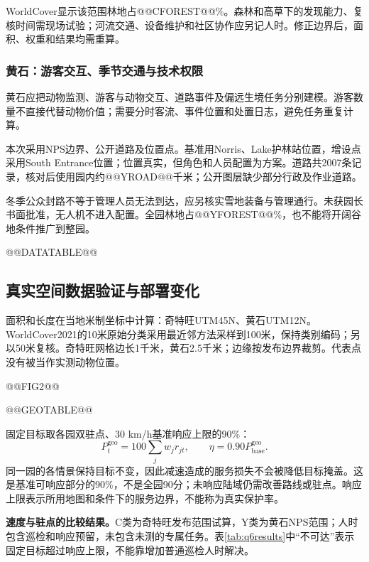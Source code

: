 \documentclass[UTF8,fontset=fandol,12pt,a4paper]{ctexart}
\begin{document}
WorldCover显示该范围林地占@@CFOREST@@\%\cite{worldcover}。森林和高草下的发现能力、复核时间需现场试验；河流交通、设备维护和社区协作应另记人时。修正边界后，面积、权重和结果均需重算。

\subsubsection{黄石：游客交互、季节交通与技术权限}

黄石应把动物监测、游客与动物交互、道路事件及偏远生境任务分别建模\cite{visitor}。游客数量不直接代替动物价值；需要分时客流、事件位置和处置日志，避免任务重复计算。

本次采用NPS边界、公开道路及位置点\cite{npsboundary,npsroads,npspois}。基准用Norris、Lake护林站位置，增设点采用South Entrance位置；位置真实，但角色和人员配置为方案。道路共2007条记录，核对后使用园内约@@YROAD@@千米；公开图层缺少部分行政及作业道路。

冬季公众封路不等于管理人员无法到达，应另核实雪地装备与管理通行\cite{conditions}。未获园长书面批准，无人机不进入配置\cite{rules}。全园林地占@@YFOREST@@\%，也不能将开阔谷地条件推广到整园。

@@DATATABLE@@

\clearpage
\subsection{真实空间数据验证与部署变化}

面积和长度在当地米制坐标中计算：奇特旺UTM45N、黄石UTM12N。WorldCover2021的10米原始分类采用最近邻方法采样到100米，保持类别编码；另以50米复核。奇特旺网格边长1千米，黄石2.5千米；边缘按发布边界裁剪。代表点没有被当作实测动物位置。

@@FIG2@@

@@GEOTABLE@@

固定目标取各园双驻点、30 km/h基准响应上限的90\%：
\begin{equation}
P_t^{\mathrm{geo}}=100\sum_jw_jr_{jt},\qquad
\eta=0.90P_{\mathrm{base}}^{\mathrm{geo}}.
\label{eq:q6cap}
\end{equation}
同一园的各情景保持目标不变，因此减速造成的服务损失不会被降低目标掩盖。这是基准可响应部分的90\%，不是全园90分；未响应陆域仍需改善路线或驻点。响应上限表示所用地图和条件下的服务边界，不能称为真实保护率。

\clearpage
\textbf{速度与驻点的比较结果。}C类为奇特旺发布范围试算，Y类为黄石NPS范围；人时包含巡检和响应预留，未包含未测的专属任务。表\ref{tab:q6results}中“不可达”表示固定目标超过响应上限，不能靠增加普通巡检人时解决。
\end{document}
